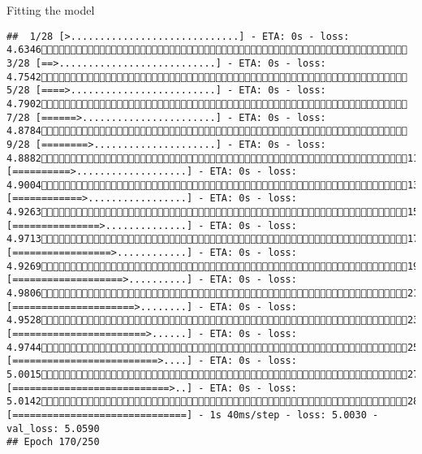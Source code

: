 \documentclass[
  ignorenonframetext,
]{beamer}
\begin{document}
\begin{frame}[fragile]{Fitting the model}
\begin{verbatim}
##  1/28 [>.............................] - ETA: 0s - loss: 4.6346 3/28 [==>...........................] - ETA: 0s - loss: 4.7542 5/28 [====>.........................] - ETA: 0s - loss: 4.7902 7/28 [======>.......................] - ETA: 0s - loss: 4.8784 9/28 [========>.....................] - ETA: 0s - loss: 4.888211/28 [==========>...................] - ETA: 0s - loss: 4.900413/28 [============>.................] - ETA: 0s - loss: 4.926315/28 [===============>..............] - ETA: 0s - loss: 4.971317/28 [=================>............] - ETA: 0s - loss: 4.926919/28 [===================>..........] - ETA: 0s - loss: 4.980621/28 [=====================>........] - ETA: 0s - loss: 4.952823/28 [=======================>......] - ETA: 0s - loss: 4.974425/28 [=========================>....] - ETA: 0s - loss: 5.001527/28 [===========================>..] - ETA: 0s - loss: 5.014228/28 [==============================] - 1s 40ms/step - loss: 5.0030 - val_loss: 5.0590
## Epoch 170/250

\end{verbatim}
\end{frame}
\end{document}
